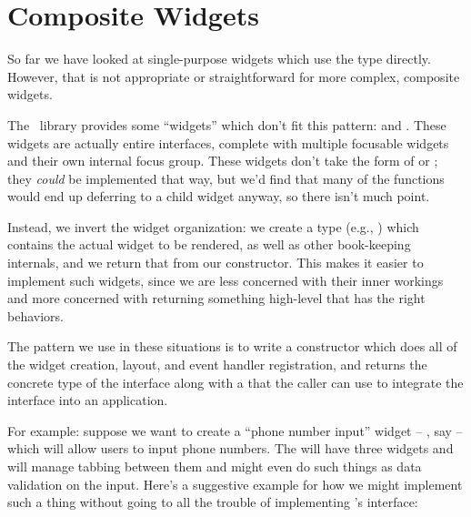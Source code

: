 \section{Composite Widgets}

So far we have looked at single-purpose widgets which use the
 type directly.  However, that is not appropriate or
straightforward for more complex, composite widgets.

The \vtyui\ library provides some ``widgets'' which don't fit this
pattern:  and .  These widgets are actually
entire interfaces, complete with multiple focusable widgets and their
own internal focus group.  These widgets don't take the form of
 or ; they \textit{could} be
implemented that way, but we'd find that many of the 
functions would end up deferring to a child widget anyway, so there
isn't much point.

Instead, we invert the widget organization: we create a type (e.g.,
) which contains the actual widget to be rendered, as well
as other book-keeping internals, and we return that from our
constructor.  This makes it easier to implement such widgets, since we
are less concerned with their inner workings and more concerned with
returning something high-level that has the right behaviors.

The pattern we use in these situations is to write a constructor which
does all of the widget creation, layout, and event handler
registration, and returns the concrete type of the interface along
with a  that the caller can use to integrate the
interface into an application.

For example: suppose we want to create a ``phone number input'' widget
-- , say -- which will allow users to input phone
numbers.  The  will have three  widgets and
will manage tabbing between them and might even do such things as data
validation on the input.  Here's a suggestive example for how we might
implement such a thing without going to all the trouble of
implementing 's interface:

